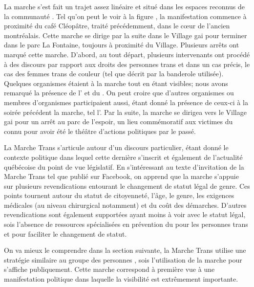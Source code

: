 La marche s'est fait un trajet assez linéaire et situé dans les espaces reconnus de la communauté \lgbt{}. 
Tel qu'on peut le voir à la figure , la manifestation commence à proximité du café Cléopâtre, traité précédemment, dans le cœur de l'ancien  montréalais. 
Cette marche se dirige par la suite dans le Village gai pour terminer dans le parc La Fontaine, toujours à proximité du Village. 
Plusieurs arrêts ont marqué cette marche. 
D'abord, au tout départ, plusieurs intervenants ont procédé à des discours par rapport aux droits des personnes trans et dans un cas précis, le cas des femmes trans de couleur (tel que décrit par la banderole utilisée).
Quelques organismes étaient à la marche tout en étant visibles; nous avons remarqué la présence de l'\atq{} et du \rlq{}. 
On peut croire que d'autres organismes ou membres d'organismes participaient aussi, étant donné la présence de ceux-ci à la soirée précédent la marche, tel l'\astteq{}. 
Par la suite, la marche se dirigea vers le Village gai pour un arrêt au parc de l'espoir, un lieu commémoratif aux victimes du \sida{}~\citep{Lafontaine2012} connu pour avoir été le théâtre d'actions politiques par le passé.

La Marche Trans s'articule autour d'un discours particulier, étant donné le contexte politique dans lequel cette dernière s'inscrit et également de l'actualité québécoise du point de vue législatif. 
En s'intéressant au texte d'invitation de la Marche Trans tel que publié sur Facebook, on apprend que la marche s'appuie sur plusieurs revendications entourant le changement de statut légal de genre. 
Ces points tournent autour du statut de citoyenneté, l'âge, le genre, les exigences médicales (au niveau chirurgical notamment) et du coût des démarches. 
D'autres revendications sont également supportées ayant moins à voir avec le statut légal, sois l'absence de ressources spécialisées en prévention du \vih{} pour les personnes trans et pour faciliter le changement de statut.

On va mieux le comprendre dans la section suivante, la Marche Trans utilise une stratégie similaire au groupe des personnes \dyke{}, sois l'utilisation de la marche pour s'affiche publiquement. 
Cette marche correspond à première vue à une manifestation politique dans laquelle la visibilité est extrêmement importante.

